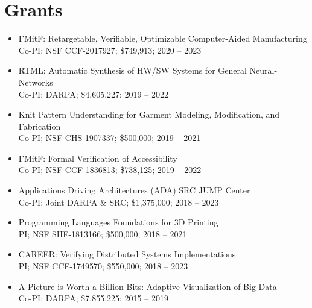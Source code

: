 \documentclass[10pt]{article}
\begin{document}


\section*{Grants}

\begin{itemize}
  \item
    FMitF: Retargetable, Verifiable, Optimizable Computer-Aided Manufacturing \\
    Co-PI; NSF CCF-2017927; \$749,913; 2020 -- 2023

  \item
    RTML: Automatic Synthesis of HW/SW Systems for General Neural-Networks \\
    Co-PI; DARPA; \$4,605,227; 2019 -- 2022

  \item
    Knit Pattern Understanding for Garment Modeling, Modification, and Fabrication \\
    Co-PI; NSF CHS-1907337; \$500,000; 2019 -- 2021

  \item
    FMitF: Formal Verification of Accessibility \\
    Co-PI; NSF CCF-1836813; \$738,125; 2019 -- 2022

  \item
    Applications Driving Architectures (ADA) SRC JUMP Center \\
    Co-PI; Joint DARPA \& SRC; \$1,375,000; 2018 -- 2023

  \item
    Programming Languages Foundations for 3D Printing \\
    PI; NSF SHF-1813166; \$500,000; 2018 -- 2021

  \item
    CAREER: Verifying Distributed Systems Implementations \\
    PI; NSF CCF-1749570; \$550,000; 2018 -- 2023

  \item
    A Picture is Worth a Billion Bits: Adaptive Visualization of Big Data \\
    Co-PI; DARPA; \$7,855,225; 2015 -- 2019
\end{itemize}
\end{document}
